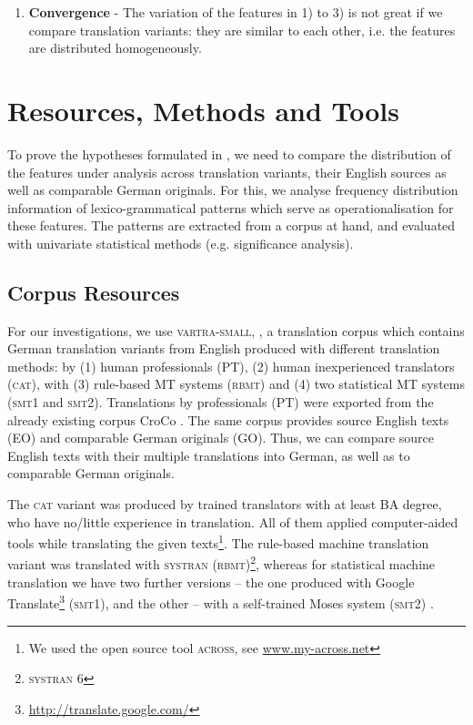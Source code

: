 \documentclass[output=paper]{LSP/langsci}
\begin{document}
\begin{enumerate}
\item \textbf{Convergence} - The variation of the features in 1) to 3) is not great if we compare translation variants: they are similar to each other, i.e. the features are distributed homogeneously.
\end{enumerate}

\section{Resources, Methods and Tools} \label{sec:4:3}

To prove the hypotheses formulated in , we need to compare the distribution of the features under analysis across translation variants, their English sources as well as comparable German originals. For this, we analyse frequency distribution information of lexico-grammatical patterns which serve as operationalisation for these features. The patterns are extracted from a corpus at hand, and evaluated with univariate statistical methods (e.g. significance analysis).

\subsection{Corpus Resources} \label{sec:4:3:1}
For our investigations, we use \textsc{vartra}-\textsc{small}, \citep[see][]{Lapshinova2013}, a translation corpus which contains German translation variants from English produced with different translation methods: by (1) human professionals (PT), (2) human inexperienced translators (\textsc{cat}), with (3) rule-based MT systems (\textsc{rbmt}) and (4) two statistical MT systems (\textsc{smt}1 and \textsc{smt}2). Translations by professionals (PT) were exported from the already existing corpus CroCo \citep{HansenSchirra2013}. The same corpus provides source English texts (EO) and comparable German originals (GO). Thus, we can compare source English texts with their multiple translations into German, as well as to comparable German originals.

The \textsc{cat} variant was produced by trained translators with at least BA degree, who have no/little experience in translation. All of them applied computer-aided tools while translating the given texts\footnote{We used the open source tool \textsc{across}, see \url{www.my-across.net}}. The rule-based machine translation variant was translated with \textsc{sy}\textsc{stran} (\textsc{rbmt})\footnote{\textsc{sy}\textsc{stran} 6}, whereas for statistical machine translation we have two further versions – the one produced with Google Translate\footnote{\url{http://translate.google.com/}} (\textsc{smt}1), and the other – with a self-trained Moses system (\textsc{smt}2) \citep[see][]{Hoang2007}.
\end{document}
